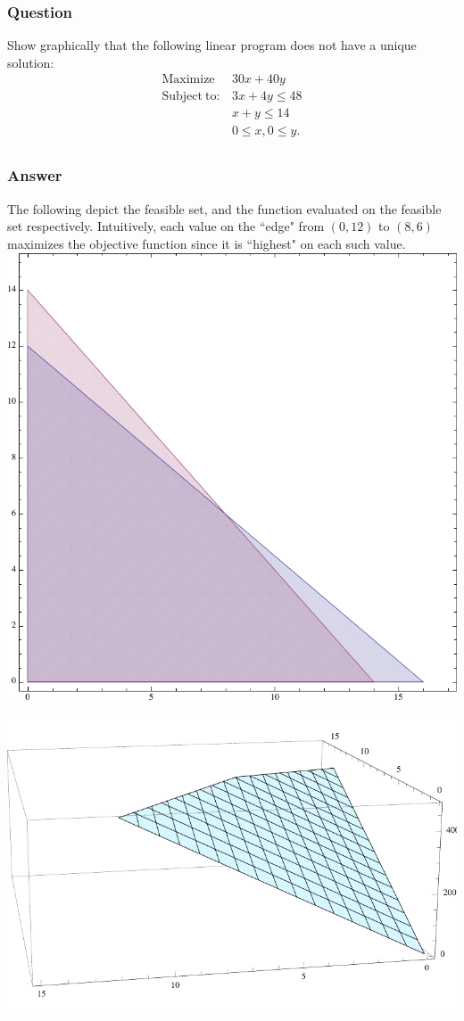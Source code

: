 \documentclass[12pt]{article}
\begin{document}
\subsubsection{Question}
Show graphically that the following linear program does not have a unique solution:
\[ \begin{array}{ll} \mathrm{Maximize} & 30 x + 40 y \\
\mathrm{Subject\ to:} & 3x+4y \leq 48\\
& x+y \leq 14\\
& 0 \leq x, 0 \leq y.\\
\end{array}
\]
\subsubsection{Answer}\label{ce}
The following depict the feasible set, and the function evaluated on the feasible set respectively. Intuitively, each value on the ``edge" from $(0,12) $ to $(8,6)$ maximizes the objective function since it is ``highest" on each such value.
\includegraphics{feasibleset}

\includegraphics{functiononset}
\end{document}
